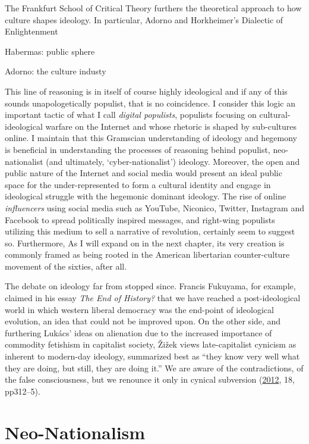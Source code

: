 \documentclass[10pt,british,A4paper,,openany]{memoir}
\begin{document}
The Frankfurt School of Critical Theory furthers the theoretical
approach to how culture shapes ideology. In particular, Adorno and
Horkheimer's Dialectic of Enlightenment

Habermas: public sphere

Adorno: the culture industy

This line of reasoning is in itself of course highly ideological and if
any of this sounds unapologetically populist, that is no coincidence. I
consider this logic an important tactic of what I call \emph{digital
populists}, populists focusing on cultural-ideological warfare on the
Internet and whose rhetoric is shaped by sub-cultures online. I maintain
that this Gramscian understanding of ideology and hegemony is beneficial
in understanding the processes of reasoning behind populist,
neo-nationalist (and ultimately, `cyber-nationalist') ideology.
Moreover, the open and public nature of the Internet and social media
would present an ideal public space for the under-represented to form a
cultural identity and engage in ideological struggle with the hegemonic
dominant ideology. The rise of online \emph{influencers} using social
media such as YouTube, Niconico, Twitter, Instagram and Facebook to
spread politically inspired messages, and right-wing populists utilizing
this medium to sell a narrative of revolution, certainly seem to suggest
so. Furthermore, As I will expand on in the next chapter, its very
creation is commonly framed as being rooted in the American libertarian
counter-culture movement of the sixties, after all.

The debate on ideology far from stopped since. Francis Fukuyama, for
example, claimed in his essay \emph{The End of History?} that we have
reached a post-ideological world in which western liberal democracy was
the end-point of ideological evolution, an idea that could not be
improved upon. On the other side, and furthering Lukács' ideas on
alienation due to the increased importance of commodity fetishism in
capitalist society, Žižek views late-capitalist cynicism as inherent to
modern-day ideology, summarized best as ``they know very well what they
are doing, but still, they are doing it.'' We are aware of the
contradictions, of the false consciousness, but we renounce it only in
cynical subversion (\protect\hyperlink{ref-zizek_mapping_2012}{2012},
18, pp312--5).

\section{Neo-Nationalism}\label{neo-nationalism}
\end{document}
